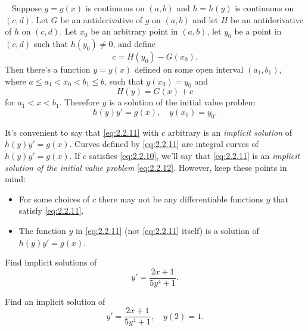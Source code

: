 \begin{theorem}
  \color{blue}
  ~\label{thmtype:2.2.1} Suppose $g=g(x)$ is continuous on $(a,b)$ and $h=h(y)$ is continuous on
  $(c,d)$. Let $G$ be an antiderivative of $g$ on $(a,b)$ and let $H$ be an antiderivative of $h$ on
  $(c,d)$. Let $x_{0}$ be an arbitrary point in $(a,b)$, let $y_{0}$ be a point in $(c,d)$ such that
  $h(y_{0})\ne0$, and define
  \begin{equation}
    \label{eq:2.2.10}c=H(y_{0})-G(x_{0}).
  \end{equation}
  Then there's a function $y=y(x)$ defined on some open interval $(a_{1},b_{1})$, where
  $a\le a_{1}<x_{0}<b_{1}\le b$, such that $y(x_{0})=y_{0}$ and
  \begin{equation}
    \label{eq:2.2.11}H(y)=G(x)+c
  \end{equation}
  for $a_{1}<x<b_{1}$. Therefore $y$ is a solution of the initial value problem
  \begin{equation}
    \label{eq:2.2.12}h(y)y'=g(x),\quad y(x_{0})=y_{0}.
  \end{equation}
\end{theorem}

It's convenient to say that \eqref{eq:2.2.11} with $c$ arbitrary is an {\color{blue}\it implicit
solution\/} of $h(y)y'=g(x)$. Curves defined by \eqref{eq:2.2.11} are integral curves of
$h(y)y'=g(x)$. If $c$ satisfies \eqref{eq:2.2.10}, we'll say that \eqref{eq:2.2.11} is an
{\color{blue}\it implicit solution of the initial value problem\/} \eqref{eq:2.2.12}. However, keep
these points in mind:
\begin{itemize}
  \item For some choices of $c$ there may not be any differentiable functions $y$ that satisfy
        \eqref{eq:2.2.11}.

  \item The function $y$ in \eqref{eq:2.2.11} (not \eqref{eq:2.2.11} itself) is a solution of
        $h(y)y'=g(x)$.
\end{itemize}

\begin{example}
  \label{example:2.2.3} \rm \mbox{}
  \newline
  \begin{alist}
    \item %
    Find implicit solutions of
    \begin{equation}
      \label{eq:2.2.13}y'=\frac{2x+1}{5y^{4}+1}.
    \end{equation}

    \item %
    Find an implicit solution of
    \begin{equation}
      \label{eq:2.2.14}y'=\frac{2x+1}{5y^{4}+1},\quad y(2)=1.
    \end{equation}
  \end{alist}
\end{example}

